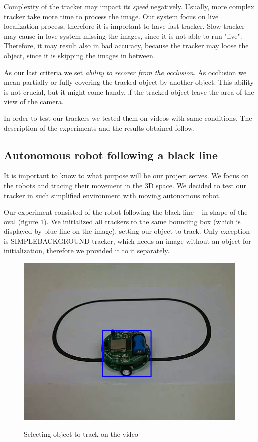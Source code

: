 Complexity of the tracker may impact its \emph{speed} negatively. Usually, more
complex tracker take more time to process the image. Our system focus on live
localization process, therefore it is important to have fast tracker. Slow
tracker may cause in love system missing the images, since it is not able to
run "live". Therefore, it may result also in bad accuracy, because the tracker
may loose the object, since it is skipping the images in between.

As our last criteria we set \emph{ability to recover from the occlusion}. As
occlusion we mean partially or fully covering the tracked object by another
object. This ability is not crucial, but it might come handy, if the tracked
object leave the area of the view of the camera.

In order to test our trackers we tested them on videos with same conditions.
The description of the experiments and the results obtained follow.

\subsection{Autonomous robot following a black line}

It is important to know to what purpose will be our project serves. We focus on
the robots and tracing their movement in the 3D space. We decided to test our
tracker in such simplified environment with moving autonomous robot.

Our experiment consisted of the robot following the black line -- in shape of
the oval (figure \ref{fig:robot-oval}). We initialized all trackers to the same
bounding box (which is displayed by blue line on the image), setting our object
to track. Only exception is SIMPLEBACKGROUND tracker, which needs an image
without an object for initialization, therefore we provided it to it
separately.

\begin{figure}
\centering
\includegraphics[width=0.6\linewidth]{img/robot-oval.png}
\label{fig:robot-oval}
\caption{Selecting object to track on the video}
\end{figure}

